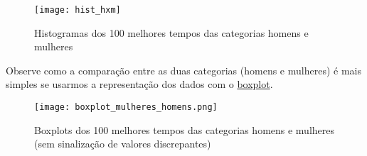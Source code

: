 \documentclass[10 pt,usenames,dvipsnames, oneside]{article}
\begin{document}
\begin{solucao}
\begin{figure}[H]
\centering

\texttt{[image: hist\_hxm]}
\caption{Histogramas dos 100 melhores tempos das categorias homens e mulheres}
\label{histograma-comparando}
\end{figure}

Observe como a comparação entre as duas categorias (homens e mulheres) é mais simples se usarmos a representação dos dados com o \hyperref[boxplot_mulheres_homens]{boxplot}.

\begin{figure}[H]
\centering

\texttt{[image: boxplot\_mulheres\_homens.png]}
\caption{Boxplots dos 100 melhores tempos das categorias homens e mulheres (sem sinalização de valores discrepantes)}
\label{boxplot_mulheres_homens}
\end{figure}

\end{solucao}
\fi
\end{document}
